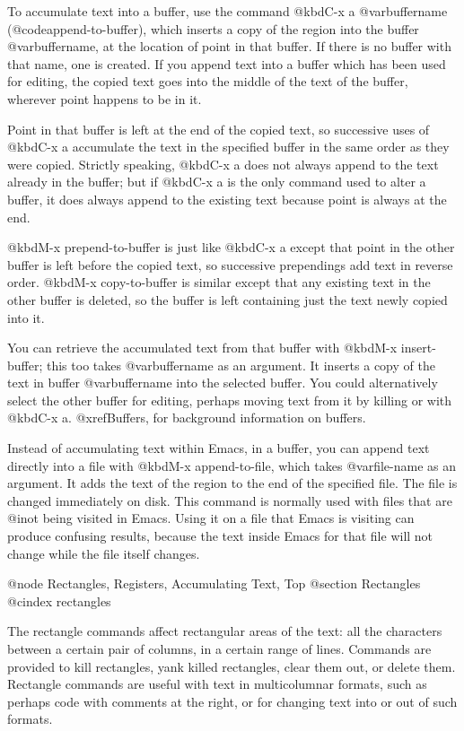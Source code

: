 {{{{{{{  To accumulate text into a buffer, use the command @kbd{C-x a @var{buffername}}
(@code{append-to-buffer}), which inserts a copy of the region into the
buffer @var{buffername}, at the location of point in that buffer.  If there
is no buffer with that name, one is created.  If you append text into a
buffer which has been used for editing, the copied text goes into the
middle of the text of the buffer, wherever point happens to be in it.

  Point in that buffer is left at the end of the copied text, so successive
uses of @kbd{C-x a} accumulate the text in the specified buffer in the same
order as they were copied.  Strictly speaking, @kbd{C-x a} does not always
append to the text already in the buffer; but if @kbd{C-x a} is the only
command used to alter a buffer, it does always append to the existing text
because point is always at the end.

  @kbd{M-x prepend-to-buffer} is just like @kbd{C-x a} except that point in
the other buffer is left before the copied text, so successive prependings
add text in reverse order.  @kbd{M-x copy-to-buffer} is similar except that
any existing text in the other buffer is deleted, so the buffer is left
containing just the text newly copied into it.

  You can retrieve the accumulated text from that buffer with @kbd{M-x
insert-buffer}; this too takes @var{buffername} as an argument.  It inserts
a copy of the text in buffer @var{buffername} into the selected buffer.
You could alternatively select the other buffer for editing, perhaps moving
text from it by killing or with @kbd{C-x a}.  @xref{Buffers}, for
background information on buffers.

  Instead of accumulating text within Emacs, in a buffer, you can append
text directly into a file with @kbd{M-x append-to-file}, which takes
@var{file-name} as an argument.  It adds the text of the region to the end
of the specified file.  The file is changed immediately on disk. This
command is normally used with files that are @i{not} being visited in
Emacs.  Using it on a file that Emacs is visiting can produce confusing
results, because the text inside Emacs for that file will not change
while the file itself changes.

@node Rectangles, Registers, Accumulating Text, Top
@section Rectangles
@cindex rectangles

  The rectangle commands affect rectangular areas of the text: all the
characters between a certain pair of columns, in a certain range of lines.
Commands are provided to kill rectangles, yank killed rectangles, clear
them out, or delete them.  Rectangle commands are useful with text in
multicolumnar formats, such as perhaps code with comments at the right,
or for changing text into or out of such formats.

}}}}}}}
